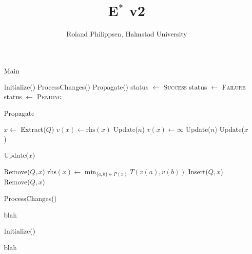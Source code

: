 \documentclass[twocolumn]{article}
\newcommand{\rhs}{\text{rhs}}
\begin{document}
\title{E$^\ast$ v2}
\author{Roland Philippsen, Halmstad University}
\maketitle

\begin{algorithm}
  \caption{Main}
  \begin{algorithmic}
    \STATE Initialize()
    \LOOP
      \STATE ProcessChanges()
      \STATE Propagate()
        \STATE status $\leftarrow$ \textsc{Success}
        \STATE status $\leftarrow$ \textsc{Failure}
      \ELSE
        \STATE status $\leftarrow$ \textsc{Pending}
      \ENDIF
    \ENDLOOP
  \end{algorithmic}
\end{algorithm}

\begin{algorithm}
  \caption{Propagate}
  \begin{algorithmic}
      \STATE $x \leftarrow$ Extract($Q$)
      \IF { $v(x) > \rhs(x)$ }
        \STATE $v(x) \leftarrow \rhs(x)$
          \STATE Update($n$)
        \ENDFOR
      \ELSE
        \STATE $v(x) \leftarrow \infty$
          \STATE Update($n$)
        \ENDFOR
        \STATE Update($x$)
      \ENDIF
    \ENDIF
  \end{algorithmic}
\end{algorithm}

\begin{algorithm}
  \caption{Update($x$)}
  \begin{algorithmic}
      \STATE Remove($Q, x$)
    \ELSE
      \STATE $\rhs(x) \leftarrow \min_{\{a,b\} \in P(x)} T(v(a),v(b))$
      \IF { $v(x) \ne \rhs(x)$ }
        \STATE Insert($Q, x$)
      \ELSE
        \STATE Remove($Q, x$)
      \ENDIF
    \ENDIF
  \end{algorithmic}
\end{algorithm}

\begin{algorithm}
  \caption{ProcessChanges()}
  \begin{algorithmic}
    \STATE blah
  \end{algorithmic}
\end{algorithm}

\begin{algorithm}
  \caption{Initialize()}
  \begin{algorithmic}
    \STATE blah
  \end{algorithmic}
\end{algorithm}
\end{document}
